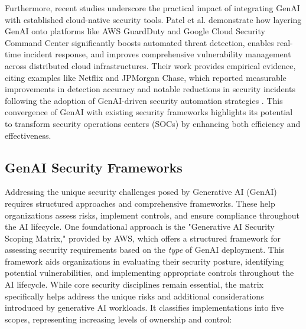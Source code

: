 Furthermore, recent studies underscore the practical impact of integrating GenAI with established cloud-native security tools. Patel et al. \cite{patel_generative_2025} demonstrate how layering GenAI onto platforms like AWS GuardDuty and Google Cloud Security Command Center significantly boosts automated threat detection, enables real-time incident response, and improves comprehensive vulnerability management across distributed cloud infrastructures. Their work provides empirical evidence, citing examples like Netflix and JPMorgan Chase, which reported measurable improvements in detection accuracy and notable reductions in security incidents following the adoption of GenAI-driven security automation strategies \cite{patel_generative_2025}. This convergence of GenAI with existing security frameworks highlights its potential to transform security operations centers (SOCs) by enhancing both efficiency and effectiveness.


\subsection{GenAI Security Frameworks}
\label{sec:GenAI Security Frameworks}

Addressing the unique security challenges posed by Generative AI (GenAI) requires structured approaches and comprehensive frameworks. These help organizations assess risks, implement controls, and ensure compliance throughout the AI lifecycle.
One foundational approach is the "Generative AI Security Scoping Matrix," provided by AWS, which offers a structured framework for assessing security requirements based on the \textit{type} of GenAI deployment\cite{noauthor_securing_nodate}. This framework aids organizations in evaluating their security posture, identifying potential vulnerabilities, and implementing appropriate controls throughout the AI lifecycle\cite{noauthor_securing_nodate}. While core security disciplines remain essential, the matrix specifically helps address the unique risks and additional considerations introduced by generative AI workloads\cite{noauthor_securing_nodate}. It classifies implementations into five scopes, representing increasing levels of ownership and control\cite{noauthor_securing_2023}:

